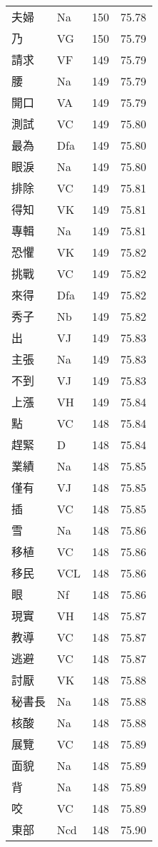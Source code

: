 \documentclass[twocolumn]{book}
\begin{document}
\begin{supertabular}{llrr}
夫婦 & Na & 150 &  75.78\\
乃 & VG & 150 &  75.79\\
請求 & VF & 149 &  75.79\\
腰 & Na & 149 &  75.79\\
開口 & VA & 149 &  75.79\\
測試 & VC & 149 &  75.80\\
最為 & Dfa & 149 &  75.80\\
眼淚 & Na & 149 &  75.80\\
排除 & VC & 149 &  75.81\\
得知 & VK & 149 &  75.81\\
專輯 & Na & 149 &  75.81\\
恐懼 & VK & 149 &  75.82\\
挑戰 & VC & 149 &  75.82\\
來得 & Dfa & 149 &  75.82\\
秀子 & Nb & 149 &  75.82\\
出 & VJ & 149 &  75.83\\
主張 & Na & 149 &  75.83\\
不到 & VJ & 149 &  75.83\\
上漲 & VH & 149 &  75.84\\
點 & VC & 148 &  75.84\\
趕緊 & D & 148 &  75.84\\
業績 & Na & 148 &  75.85\\
僅有 & VJ & 148 &  75.85\\
插 & VC & 148 &  75.85\\
雪 & Na & 148 &  75.86\\
移植 & VC & 148 &  75.86\\
移民 & VCL & 148 &  75.86\\
眼 & Nf & 148 &  75.86\\
現實 & VH & 148 &  75.87\\
教導 & VC & 148 &  75.87\\
逃避 & VC & 148 &  75.87\\
討厭 & VK & 148 &  75.88\\
秘書長 & Na & 148 &  75.88\\
核酸 & Na & 148 &  75.88\\
展覽 & VC & 148 &  75.89\\
面貌 & Na & 148 &  75.89\\
背 & Na & 148 &  75.89\\
咬 & VC & 148 &  75.89\\
東部 & Ncd & 148 &  75.90\\

\end{supertabular}
\end{document}
